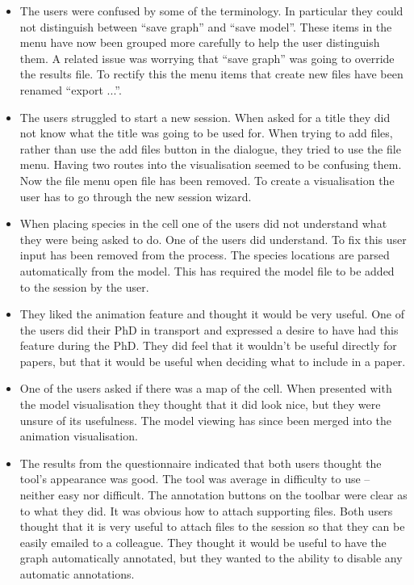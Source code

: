 \begin{itemize}
\item The users were confused by some of the terminology.  In particular they could not distinguish between ``save graph'' and ``save model''. These items in the menu have now been grouped more carefully to help the user distinguish them.  A related issue was worrying that ``save graph'' was going to override the results file.  To rectify this the menu items that create new files have been renamed ``export ...''.
\item The users struggled to start a new session.  When asked for a title they did not know what the title was going to be used for.  When trying to add files, rather than use the add files button in the dialogue, they tried to use the file menu.  Having two routes into the visualisation seemed to be confusing them.  Now the file menu open file has been removed.  To create a visualisation the user has to go through the new session wizard.
\item When placing species in the cell one of the users did not understand what they were being asked to do.  One of the users did understand.  To fix this user input has been removed from the process.  The species locations are parsed automatically from the model.  This has required the model file to be added to the session by the user.
\item They liked the animation feature and thought it would be very useful. One of the users did their PhD in transport and expressed a desire to have had this feature during the PhD.  They did feel that it wouldn't be useful directly for papers, but that it would be useful when deciding what to include in a paper.
\item One of the users asked if there was a map of the cell.  When presented with the model visualisation they thought that it did look nice, but they were unsure of its usefulness.  The model viewing has since been merged into the animation visualisation.
\item The results from the questionnaire indicated that both users thought the tool's appearance was good.  The tool was average in difficulty to use -- neither easy nor difficult. The annotation buttons on the toolbar were clear as to what they did. It was obvious how to attach supporting files.  Both users thought that it is very useful to attach files to the session so that they can be easily emailed to a colleague.  They thought it would be useful to have the graph automatically annotated, but they wanted to the ability to disable any automatic annotations.
\end{itemize}

